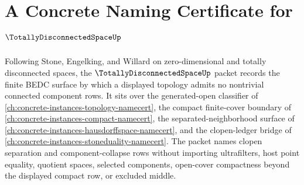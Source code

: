 \chapter{A Concrete Naming Certificate for $\TotallyDisconnectedSpaceUp$}
\label{ch:concrete-instances-totally-disconnected-space-namecert}

Following Stone, Engelking, and Willard on zero-dimensional and totally disconnected spaces, the $\TotallyDisconnectedSpaceUp$ packet records the finite BEDC surface by which a displayed topology admits no nontrivial connected component rows. It sits over the generated-open classifier of \autoref{ch:concrete-instances-topology-namecert}, the compact finite-cover boundary of \autoref{ch:concrete-instances-compact-namecert}, the separated-neighborhood surface of \autoref{ch:concrete-instances-hausdorffspace-namecert}, and the clopen-ledger bridge of \autoref{ch:concrete-instances-stoneduality-namecert}. The packet names clopen separation and component-collapse rows without importing ultrafilters, host point equality, quotient spaces, selected components, open-cover compactness beyond the displayed compact row, or excluded middle.

